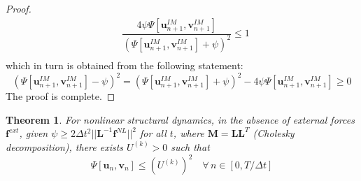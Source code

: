 \documentclass[review]{elsarticle}
\newtheorem{theorem}{Theorem}[section]
\begin{document}
\begin{proof}
    \begin{equation}
      \begin{array}{ll}
            &\dfrac{4 \psi \Psi[\boldsymbol{u}_{n+1}^{IM},\boldsymbol{v}_{n+1}^{IM}] }{\left(\Psi[\boldsymbol{u}_{n+1}^{IM},\boldsymbol{v}_{n+1}^{IM}]+\psi\right)^2} \le 1 \\
      \end{array} 
      \label{eqn:4thIdentity1}
    \end{equation}
    which in turn is obtained from the following statement:
    \begin{equation}
        {\left(\Psi[\boldsymbol{u}_{n+1}^{IM},\boldsymbol{v}_{n+1}^{IM}]-\psi\right)^2} = {\left(\Psi[\boldsymbol{u}_{n+1}^{IM},\boldsymbol{v}_{n+1}^{IM}]+\psi\right)^2} - 4 \psi \Psi[\boldsymbol{u}_{n+1}^{IM},\boldsymbol{v}_{n+1}^{IM}] \ge 0
    \end{equation}
  The proof is complete.
\end{proof}

\begin{theorem}
\label{theorem:4th2}
  For nonlinear structural dynamics, in the absence of external forces $\boldsymbol{f}^{ext}$,
  given $\psi \ge 2\Delta t^2||\boldsymbol{L}^{-1}\boldsymbol{f}^{NL}||^2$ for all $t$, where $\boldsymbol{M}=\boldsymbol{L}\boldsymbol{L}^T$ (Cholesky decomposition), there exists $U^{(k)}>0$ such that
  \begin{equation}
      \Psi[\boldsymbol{u}_n,\boldsymbol{v}_n] \le \left(U^{(k)}\right)^2 \quad  \forall \, n \in [0, T/\Delta t] \label{eqn:4thNLTheorem2}
  \end{equation}
\end{theorem}
\end{document}
